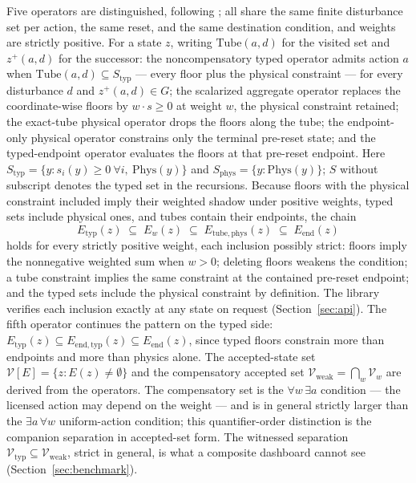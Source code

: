\documentclass[11pt]{article}
\begin{document}
Five operators are distinguished, following \citet{Abaee2026a}; all share
the same finite disturbance set per action, the same reset, and the same
destination condition, and weights are strictly positive. For a state $z$,
writing $\mathrm{Tube}(a,d)$ for the visited set and $z^{+}(a,d)$ for the
successor: the noncompensatory typed operator admits action $a$ when
$\mathrm{Tube}(a,d) \subseteq S_{\mathrm{typ}}$ --- every floor plus the
physical constraint --- for every disturbance $d$ and $z^{+}(a,d) \in G$;
the scalarized aggregate operator replaces the coordinate-wise floors by
$w \cdot s \geq 0$ at weight $w$, the physical constraint retained; the
exact-tube physical operator drops the floors along the tube; the
endpoint-only physical operator constrains only the terminal pre-reset
state; and the typed-endpoint operator evaluates the floors at that
pre-reset endpoint. Here
$S_{\mathrm{typ}} = \{y : s_i(y) \geq 0\ \forall i,\ \mathrm{Phys}(y)\}$
and $S_{\mathrm{phys}} = \{y : \mathrm{Phys}(y)\}$; $S$ without subscript
denotes the typed set in the recursions. Because floors with the physical
constraint included imply their weighted shadow under positive weights,
typed sets include physical ones, and tubes contain their endpoints, the
chain
\[
E_{\mathrm{typ}}(z) \;\subseteq\; E_w(z) \;\subseteq\;
E_{\mathrm{tube,phys}}(z) \;\subseteq\; E_{\mathrm{end}}(z)
\]
holds for every strictly positive weight, each inclusion possibly strict:
floors imply the nonnegative weighted sum when $w > 0$; deleting floors
weakens the condition; a tube constraint implies the same constraint at
the contained pre-reset endpoint; and the typed sets include the physical
constraint by definition. The library verifies each inclusion exactly at
any state on request (Section~\ref{sec:api}). The fifth operator continues the
pattern on the typed side: $E_{\mathrm{typ}}(z) \subseteq
E_{\mathrm{end,typ}}(z) \subseteq E_{\mathrm{end}}(z)$, since typed floors
constrain more than endpoints and more than physics alone. The accepted-state set
$\mathcal{V}[E] = \{ z : E(z) \neq \emptyset \}$ and the compensatory
accepted set $\mathcal{V}_{\mathrm{weak}} = \bigcap_w \mathcal{V}_w$ are
derived from the operators. The compensatory set is the
$\forall w\, \exists a$ condition --- the licensed action may depend on
the weight --- and is in general strictly larger than the
$\exists a\, \forall w$ uniform-action condition; this quantifier-order
distinction is the companion separation in accepted-set form. The
witnessed separation
$\mathcal{V}_{\mathrm{typ}} \subseteq \mathcal{V}_{\mathrm{weak}}$, strict in
general, is what a composite dashboard cannot see (Section~\ref{sec:benchmark}).
\end{document}
